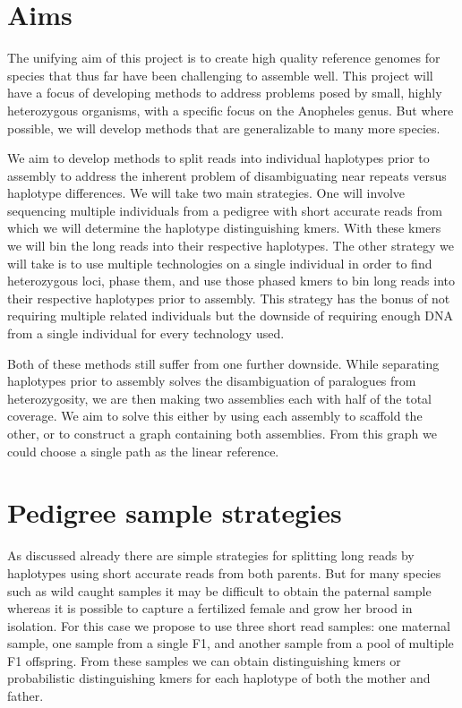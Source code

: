 \section{Aims}
The unifying aim of this project is to create high quality reference genomes for species that thus far have been challenging to assemble well. 
This project will have a focus of developing methods to address problems posed by small, highly heterozygous organisms, with a specific focus 
on the Anopheles genus. But where possible, we will develop methods that are generalizable to many more species. 

We aim to develop methods to split reads into individual haplotypes prior to assembly to address the inherent problem of 
disambiguating near repeats versus haplotype differences. We will take two main strategies. One will involve sequencing multiple 
individuals from a pedigree with short accurate reads from which we will determine the haplotype distinguishing kmers.  With these kmers we  
will bin the long reads into their respective haplotypes. The other strategy we will take is to use multiple technologies on a single individual 
in order to find heterozygous loci, phase them, and use those phased kmers to bin long reads into their respective haplotypes prior to 
assembly. This strategy has the bonus of not requiring multiple related individuals but  the downside of requiring enough DNA from a single individual for every technology used.

Both of these methods still suffer from one further downside. While separating haplotypes prior to assembly solves the disambiguation of paralogues 
from heterozygosity, we are then making two assemblies each with half of the total coverage. We aim to solve this either by using each assembly 
to scaffold the other, or to construct a graph containing both assemblies. From this graph we could choose a single path as the linear reference.


\section{Pedigree sample strategies}
As discussed already there are simple strategies for splitting long reads by haplotypes using short accurate reads from both parents. 
But for many species such as wild caught samples it may be difficult to obtain the paternal sample whereas it is possible to capture a 
fertilized female and grow her brood in isolation. For this case we propose to use three short read samples: one maternal sample, one sample 
from a single F1, and another sample from a pool of multiple F1 offspring. From these samples we can obtain distinguishing kmers or probabilistic 
distinguishing kmers for each haplotype of both the mother and father.

